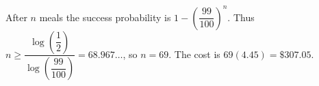 After $n$ meals the success probability is $1-(\dfrac{99}{100})^n$. Thus $n\ge\dfrac{\log(\dfrac{1}{2})}{\log(\dfrac{99}{100})}=68.967\ldots$, so $n=69$. The cost is $69(4.45)=\boxed{\$307.05}$.
